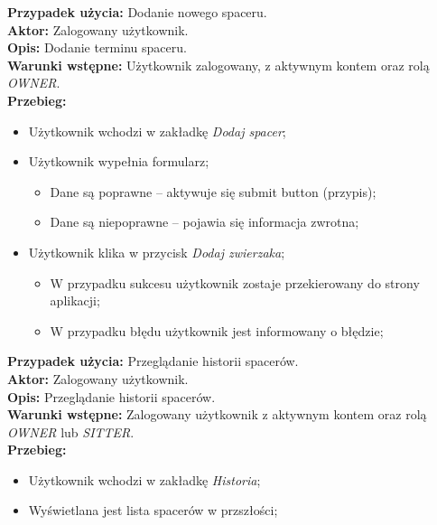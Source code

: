 \noindent
\textbf{Przypadek użycia:} Dodanie nowego spaceru. \\
\textbf{Aktor:} Zalogowany użytkownik. \\
\textbf{Opis:} Dodanie terminu spaceru. \\
\textbf{Warunki wstępne:} Użytkownik zalogowany, z aktywnym kontem oraz rolą \textit{OWNER}. \\
\textbf{Przebieg:}
\begin{itemize}[leftmargin=1cm]
    \item Użytkownik wchodzi w zakładkę \textit{Dodaj spacer};
    \item Użytkownik wypełnia formularz;
    \begin{itemize}
        \item Dane są poprawne -- aktywuje się submit button (przypis);
        \item Dane są niepoprawne -- pojawia się informacja zwrotna;
    \end{itemize}
    \item Użytkownik klika w przycisk \textit{Dodaj zwierzaka};
    \begin{itemize}
        \item W przypadku sukcesu użytkownik zostaje przekierowany do strony aplikacji;
        \item W przypadku błędu użytkownik jest informowany o błędzie;
    \end{itemize}
\end{itemize}

\noindent
\textbf{Przypadek użycia:} Przeglądanie historii spacerów. \\
\textbf{Aktor:} Zalogowany użytkownik. \\
\textbf{Opis:} Przeglądanie historii spacerów. \\
\textbf{Warunki wstępne:} Zalogowany użytkownik z aktywnym kontem oraz rolą \textit{OWNER} lub \textit{SITTER}. \\
\textbf{Przebieg:}
\begin{itemize}[leftmargin=1cm]
    \item Użytkownik wchodzi w zakładkę \textit{Historia};
    \item Wyświetlana jest lista spacerów w przszłości;
\end{itemize}

